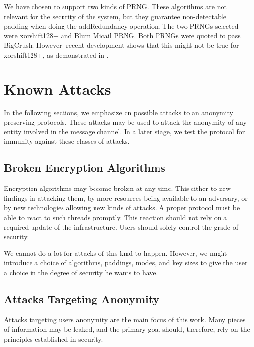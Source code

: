 We have chosen to support two kinds of PRNG. These algorithms are not relevant for the security of the system, but they guarantee non-detectable padding when doing the addRedundancy operation. The two PRNGs selected were xorshift128+ and Blum Micail PRNG. Both PRNGs were quoted to pass BigCrush. However, recent development shows that this might not be true for xorshift128+, as demonstrated in \cite{LEMIRE2019139}.

\section{Known Attacks}
In the following sections, we emphasize on possible attacks to an anonymity preserving protocols. These attacks may be used to attack the anonymity of any entity involved in the message channel. In a later stage, we test the protocol for immunity against these classes of attacks.

\subsection{Broken Encryption Algorithms}
Encryption algorithms may become broken at any time. This either to new findings in attacking them, by more resources being available to an adversary, or by new technologies allowing new kinds of attacks. A proper protocol must be able to react to such threads promptly. This reaction should not rely on a required update of the infrastructure. Users should solely control the grade of security. 

We cannot do a lot for attacks of this kind to happen. However, we might introduce a choice of algorithms, paddings, modes, and key sizes to give the user a choice in the degree of security he wants to have.

\subsection{Attacks Targeting Anonymity}
Attacks targeting users anonymity are the main focus of this work. Many pieces of information may be leaked, and the primary goal should, therefore, rely on the principles established in security.

